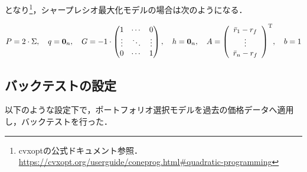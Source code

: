 \documentclass[dvipdfmx,autodetect-engine]{jsarticle}
\begin{document}
となり\footnote{cvxoptの公式ドキュメント参照．\url{https://cvxopt.org/userguide/coneprog.html\#quadratic-programming}}，シャープレシオ最大化モデルの場合は次のようになる．

\begin{align}
    P = 2 \cdot \Sigma, \hspace{1em}
    q = {\bf 0}_n, \hspace{1em}
    G = -1 \cdot
        \begin{pmatrix}
            1 & \cdots & 0 \\
            \vdots & \ddots & \vdots \\
            0 & \cdots & 1 
        \end{pmatrix}, \hspace{1em}
    h = {\bf 0}_n, \hspace{1em}
    A = {\left(
            \begin{array}{c}
              \bar{r}_1 - r_f \\
              \vdots \\
              \bar{r}_n - r_f
            \end{array}
        \right)}^{\mathrm{T}}, \hspace{1em}
    b = 1
\end{align}

\subsection{バックテストの設定}

以下のような設定下で，ポートフォリオ選択モデルを過去の価格データへ適用し，バックテストを行った．
\end{document}

